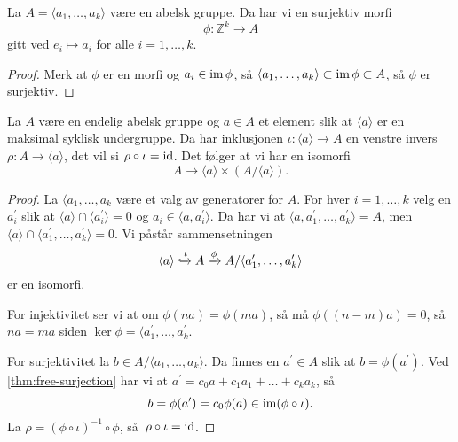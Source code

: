 \begin{lemma}\label{thm:free-surjection}
    La $A = \langle a_1,\dots,a_k\rangle$ være en abelsk gruppe.
    Da har vi en surjektiv morfi
    \[
        \phi\colon\mathbb Z^k\to A
    \]
    gitt ved $e_i\mapsto a_i$ for alle $i=1,\dots,k$.
\end{lemma}
\begin{proof}
    Merk at $\phi$ er en morfi og $a_i\in \operatorname{im}\phi$,
    så $\langle a_1,\dots,a_k\rangle\subset \operatorname{im}\phi\subset A$,
    så $\phi$ er surjektiv.
\end{proof}

\begin{corollary}\label{thm:maximal-cycle-split}
    La $A$ være en endelig abelsk gruppe og $a\in A$
    et element slik at $\langle a\rangle$ er en maksimal syklisk undergruppe.
    Da har inklusjonen $\iota \colon \langle a\rangle\to A$ en venstre invers
    $\rho\colon A\to \langle a\rangle$,
    det vil si $\rho\circ \iota = \operatorname{id}$.
    Det følger at vi har en isomorfi
    \[
        A \to \langle a\rangle \times (A / \langle a\rangle).
    \]
\end{corollary}
\begin{proof}
    La $\langle a_1,\dots, a_k$ være et valg av generatorer for $A$.
    For hver $i = 1,\dots,k$ velg en $a_i^\prime$
    slik at $\langle a\rangle\cap \langle a_i^\prime\rangle = 0$
    og $a_i \in \langle a, a_i^\prime\rangle$.
    Da har vi at $\langle a, a_1^\prime,\dots,a_k^\prime\rangle = A$,
    men $\langle a\rangle \cap \langle a_1^\prime,\dots,a_k^\prime\rangle = 0$.
    Vi påstår sammensetningen
    \[
        \langle a\rangle
        \xhookrightarrow{\iota}
        A
        \xrightarrow{\phi}
        A / \langle a_1^\prime,\dots,a_k^\prime\rangle
    \]
    er en isomorfi.

    For injektivitet ser vi at om $\phi(na) = \phi(ma)$,
    så må $\phi((n - m)a) = 0$, så $na = ma$ siden
    $\ker\phi = \langle a_1^\prime, \dots, a_k^\prime$.

    For surjektivitet la $b\in A / \langle a_1,\dots,a_k\rangle$.
    Da finnes en $a^\prime\in A$ slik at
    $b = \phi(a^\prime)$.
    Ved \cref{thm:free-surjection} har vi at
    $a^\prime = c_0 a + c_1 a_1 + \dots + c_k a_k$,
    så
    \[
        b = \phi(a^\prime) = c_0\phi(a)\in \operatorname{im}(\phi\circ\iota).
    \]
    La $\rho = {(\phi\circ\iota)}^{-1}\circ \phi$,
    så $\rho\circ\iota = \operatorname{id}$.
\end{proof}

